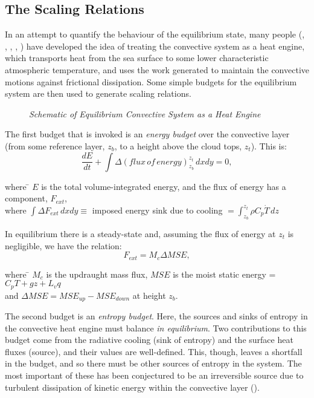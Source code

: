 \documentclass[11pt,a4paper]{article}
\begin{document}
\subsection{The Scaling Relations}
In an attempt to quantify the behaviour of the equilibrium state, many
people (\cite{renno}, \cite{robe}, \cite{emanuel}, \cite{craig}, \cite{shutts}) have developed the idea of treating the convective system as a
heat engine, which transports heat from the sea surface to some lower
characteristic atmospheric temperature, and uses the work generated to
maintain the convective motions against frictional dissipation. Some
simple budgets for the equilibrium system are then used to generate
scaling relations.\\
\begin{figure}[ht!!]
\center
\mbox{}
\caption{\it{Schematic of Equilibrium Convective System as a Heat
Engine}}
\end{figure}

The first budget that is invoked is an \textit{energy budget} over
the convective layer (from some reference layer, $z_b$, to a height above
the cloud tops, $z_t$). This is:
\begin{equation}
\frac{dE}{dt} + \int \Delta (flux \, of \, energy)^{z_t}_{z_b} \, dxdy = 0,
\end{equation}
\begin{tabbing}
where \= $E$ is the total volume-integrated energy, and the flux of
energy has a component, $F_{ext}$,\\
where \>$\int \Delta
F_{ext} \, dxdy \equiv$ imposed energy sink due to cooling $ =
 \int_{z_b}^{z_t} \rho C_p \dot{T} \, dz$
\end{tabbing}
In equilibrium there is a steady-state and, assuming the flux of
energy at $z_t$ is negligible, we have the relation:
\begin{equation}
F_{ext} = M_c \Delta MSE,
\end{equation}
\begin{tabbing}
where \= $M_c$ is the updraught mass flux, $MSE$ is the moist static energy = $C_pT+gz+L_vq$ \\
and \> $\Delta MSE = MSE_{up} - MSE_{down}$ at height $z_b$. 
\end{tabbing}
The second budget is an \textit{entropy budget}. Here, the sources and
sinks of entropy in the convective heat engine must
balance \textit{in equilibrium}. Two contributions to this budget come from the radiative cooling (sink of entropy) and the surface heat
fluxes (source), and their values are well-defined. This, though, leaves a
shortfall in the budget, and so there must
be other sources of entropy in the system. The most important of these
has been conjectured to be an irreversible source due to turbulent
dissipation of kinetic energy within the convective layer (\cite{emanuel}). 
\end{document}
